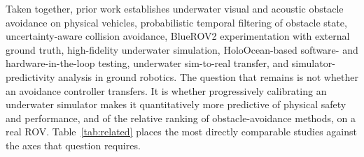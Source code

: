 Taken together, prior work establishes underwater visual and acoustic
obstacle avoidance on physical vehicles, probabilistic temporal filtering of
obstacle state, uncertainty-aware collision avoidance, BlueROV2
experimentation with external ground truth, high-fidelity underwater
simulation, HoloOcean-based software- and hardware-in-the-loop testing,
underwater sim-to-real transfer, and simulator-predictivity analysis in
ground robotics. The question that remains is not whether an avoidance
controller transfers. It is whether progressively calibrating an underwater
simulator makes it quantitatively more predictive of physical safety and
performance, and of the relative ranking of obstacle-avoidance methods, on a
real ROV. Table~\ref{tab:related} places the most directly comparable studies
against the axes that question requires.


